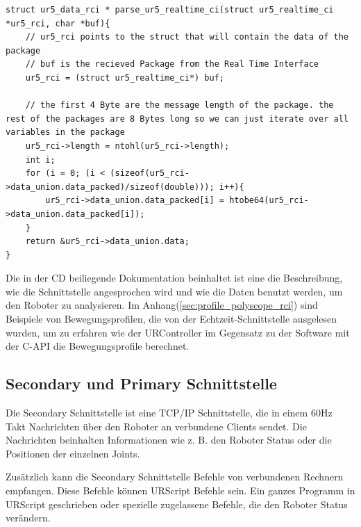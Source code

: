 \begin{lstlisting}[caption={Umwandlung der Byte-Order für Packet über die Echtzeit-Schnittstellen }, label=lst:rci_parse ,captionpos=b]
struct ur5_data_rci * parse_ur5_realtime_ci(struct ur5_realtime_ci *ur5_rci, char *buf){
    // ur5_rci points to the struct that will contain the data of the package
    // buf is the recieved Package from the Real Time Interface
    ur5_rci = (struct ur5_realtime_ci*) buf;

    // the first 4 Byte are the message length of the package. the rest of the packages are 8 Bytes long so we can just iterate over all variables in the package 
    ur5_rci->length = ntohl(ur5_rci->length);
    int i;
    for (i = 0; (i < (sizeof(ur5_rci->data_union.data_packed)/sizeof(double))); i++){
        ur5_rci->data_union.data_packed[i] = htobe64(ur5_rci->data_union.data_packed[i]);
    }
    return &ur5_rci->data_union.data;
}
\end{lstlisting}

Die in der CD beiliegende Dokumentation beinhaltet ist eine die Beschreibung, wie die Schnittstelle angesprochen wird und wie die Daten benutzt werden, um den Roboter zu analysieren. Im Anhang(\ref{sec:profile_polyscope_rci}) sind Beispiele von Bewegungsprofilen, die von der Echtzeit-Schnittstelle ausgelesen wurden, um zu erfahren wie der URController im Gegensatz zu der Software mit der C-\ac{API} die Bewegungsprofile berechnet.

\subsection{Secondary und Primary Schnittstelle}
\label{urcontrol_spi_gru}

Die Secondary Schnittstelle ist eine \acs{TCP/IP} Schnittstelle, die in einem 60Hz Takt Nachrichten über den Roboter an verbundene Clients sendet.
Die Nachrichten beinhalten Informationen wie z. B. den Roboter Status oder die Positionen der einzelnen Joints.

Zusätzlich kann die Secondary Schnittstelle Befehle von verbundenen Rechnern empfangen.
Diese Befehle können URScript Befehle sein. Ein ganzes Programm in URScript geschrieben oder spezielle zugelassene Befehle, die den Roboter Status verändern.


